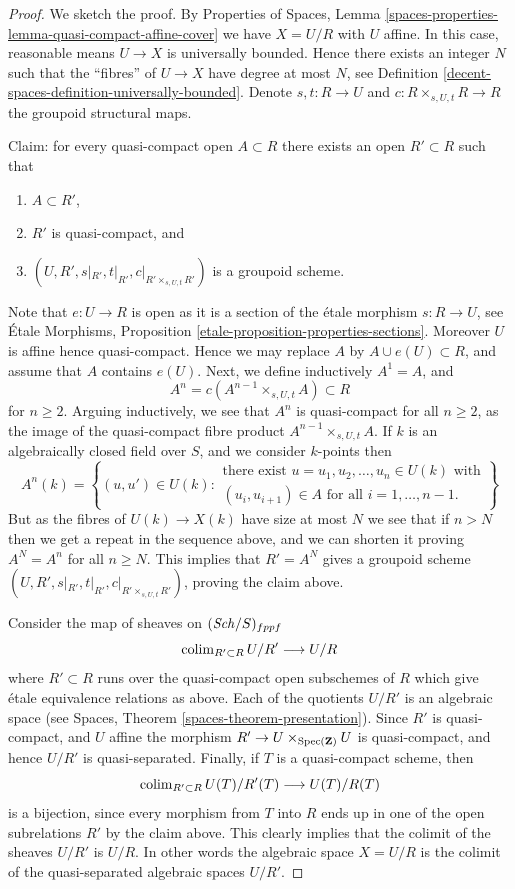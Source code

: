 \begin{proof}
We sketch the proof. By
Properties of Spaces, Lemma
\ref{spaces-properties-lemma-quasi-compact-affine-cover}
we have $X = U/R$ with $U$ affine.
In this case, reasonable means $U \to X$ is universally bounded.
Hence there exists an integer $N$ such that the ``fibres'' of $U \to X$
have degree at most $N$, see
Definition \ref{decent-spaces-definition-universally-bounded}.
Denote $s, t : R \to U$ and $c : R \times_{s, U, t} R \to R$ the
groupoid structural maps.

\medskip\noindent
Claim: for every quasi-compact open $A \subset R$ there exists
an open $R' \subset R$ such that
\begin{enumerate}
\item $A \subset R'$,
\item $R'$ is quasi-compact, and
\item $(U, R', s|_{R'}, t|_{R'}, c|_{R' \times_{s, U, t} R'})$ is
a groupoid scheme.
\end{enumerate}
Note that $e : U \to R$ is open as it is a section of the \'etale morphism
$s : R \to U$, see
\'Etale Morphisms, Proposition \ref{etale-proposition-properties-sections}.
Moreover $U$ is affine hence quasi-compact. Hence we may replace $A$ by
$A \cup e(U) \subset R$, and assume that $A$ contains $e(U)$. Next, we
define inductively $A^1 = A$, and
$$
A^n = c(A^{n - 1} \times_{s, U, t} A) \subset R
$$
for $n \geq 2$. Arguing inductively, we see that $A^n$ is quasi-compact for
all $n \geq 2$, as the image of the quasi-compact fibre product
$A^{n - 1} \times_{s, U, t} A$. If $k$ is an algebraically
closed field over $S$, and we consider $k$-points then
$$
A^n(k) = \left\{(u, u') \in U(k)
:
\begin{matrix}
\text{there exist } u = u_1, u_2, \ldots, u_n \in U(k)\text{ with} \\
(u_i , u_{i + 1}) \in A \text{ for all }i = 1, \ldots, n - 1.
\end{matrix}
\right\}
$$
But as the fibres of $U(k) \to X(k)$ have size at most $N$ we see that if
$n > N$ then we get a repeat in the sequence above, and we can shorten it
proving $A^N = A^n$ for all $n \geq N$.
This implies that $R' = A^N$ gives a groupoid scheme
$(U, R', s|_{R'}, t|_{R'}, c|_{R' \times_{s, U, t} R'})$, proving the claim
above.

\medskip\noindent
Consider the map of sheaves on $(\mathit{Sch}/S)_{fppf}$
$$
\operatorname{colim}_{R' \subset R} U/R' \longrightarrow U/R
$$
where $R' \subset R$ runs over the quasi-compact open subschemes
of $R$ which give \'etale equivalence relations as above. Each of the
quotients $U/R'$ is an algebraic space
(see Spaces, Theorem \ref{spaces-theorem-presentation}).
Since $R'$ is quasi-compact, and $U$ affine the morphism
$R' \to U \times_{\operatorname{Spec}(\mathbf{Z})} U$ is quasi-compact,
and hence $U/R'$ is quasi-separated. Finally, if $T$ is a quasi-compact
scheme, then
$$
\operatorname{colim}_{R' \subset R} U(T)/R'(T) \longrightarrow U(T)/R(T)
$$
is a bijection, since every morphism from $T$ into $R$ ends up in one
of the open subrelations $R'$ by the claim above. This clearly implies
that the colimit of the sheaves $U/R'$ is $U/R$. In other words
the algebraic space $X = U/R$ is the colimit of the quasi-separated
algebraic spaces $U/R'$.


\end{proof}
